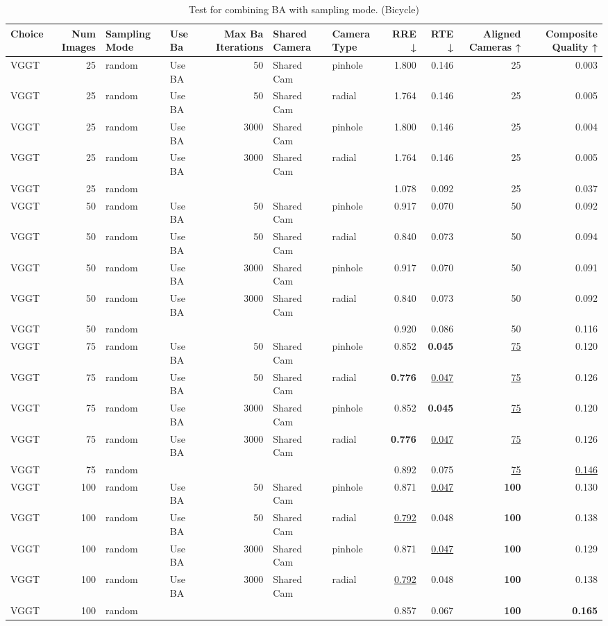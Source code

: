 \begin{table}[H]
\caption{Test for combining BA with sampling mode. (Bicycle)}
\label{tab:99_ba_sampling_mode_bicycle}
\begin{tabular}{lrllrllrrrr}
\toprule
Choice & Num Images & Sampling Mode & Use Ba & Max Ba Iterations & Shared Camera & Camera Type & RRE ↓ & RTE ↓ & Aligned Cameras ↑ & Composite Quality ↑ \\
\midrule
VGGT & 25 & random & Use BA & 50 & Shared Cam & pinhole & 1.800 & 0.146 & 25 & 0.003 \\
VGGT & 25 & random & Use BA & 50 & Shared Cam & radial & 1.764 & 0.146 & 25 & 0.005 \\
VGGT & 25 & random & Use BA & 3000 & Shared Cam & pinhole & 1.800 & 0.146 & 25 & 0.004 \\
VGGT & 25 & random & Use BA & 3000 & Shared Cam & radial & 1.764 & 0.146 & 25 & 0.005 \\
VGGT & 25 & random &  &  &  &  & 1.078 & 0.092 & 25 & 0.037 \\
VGGT & 50 & random & Use BA & 50 & Shared Cam & pinhole & 0.917 & 0.070 & 50 & 0.092 \\
VGGT & 50 & random & Use BA & 50 & Shared Cam & radial & 0.840 & 0.073 & 50 & 0.094 \\
VGGT & 50 & random & Use BA & 3000 & Shared Cam & pinhole & 0.917 & 0.070 & 50 & 0.091 \\
VGGT & 50 & random & Use BA & 3000 & Shared Cam & radial & 0.840 & 0.073 & 50 & 0.092 \\
VGGT & 50 & random &  &  &  &  & 0.920 & 0.086 & 50 & 0.116 \\
VGGT & 75 & random & Use BA & 50 & Shared Cam & pinhole & 0.852 & \textbf{0.045} & \underline{75} & 0.120 \\
VGGT & 75 & random & Use BA & 50 & Shared Cam & radial & \textbf{0.776} & \underline{0.047} & \underline{75} & 0.126 \\
VGGT & 75 & random & Use BA & 3000 & Shared Cam & pinhole & 0.852 & \textbf{0.045} & \underline{75} & 0.120 \\
VGGT & 75 & random & Use BA & 3000 & Shared Cam & radial & \textbf{0.776} & \underline{0.047} & \underline{75} & 0.126 \\
VGGT & 75 & random &  &  &  &  & 0.892 & 0.075 & \underline{75} & \underline{0.146} \\
VGGT & 100 & random & Use BA & 50 & Shared Cam & pinhole & 0.871 & \underline{0.047} & \textbf{100} & 0.130 \\
VGGT & 100 & random & Use BA & 50 & Shared Cam & radial & \underline{0.792} & 0.048 & \textbf{100} & 0.138 \\
VGGT & 100 & random & Use BA & 3000 & Shared Cam & pinhole & 0.871 & \underline{0.047} & \textbf{100} & 0.129 \\
VGGT & 100 & random & Use BA & 3000 & Shared Cam & radial & \underline{0.792} & 0.048 & \textbf{100} & 0.138 \\
VGGT & 100 & random &  &  &  &  & 0.857 & 0.067 & \textbf{100} & \textbf{0.165} \\
\bottomrule
\end{tabular}
\end{table}
